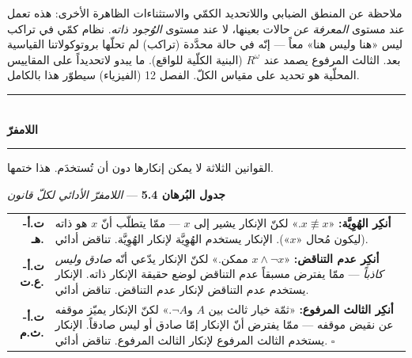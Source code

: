 \documentclass[10pt, openany, oneside]{book}
\renewcommand{\normalsize}{\fontsize{10}{13}\selectfont}
\renewcommand{\footnotesize}{\fontsize{8.5}{11}\selectfont}
\begin{document}
ملاحظة عن المنطق الضبابي واللاتحديد الكمّي والاستثناءات الظاهرة الأخرى: هذه تعمل عند مستوى \textit{المعرفة عن} حالات بعينها، لا عند مستوى \textit{الوُجود ذاته}. نظام كمّي في تراكب ليس «هنا وليس هنا» معاً --- إنّه في حالة محدَّدة (تراكب) لم تحلّها بروتوكولاتنا القياسية بعد. الثالث المرفوع يصمد عند $R^\omega$ (البنية الكلّية للواقع). ما يبدو لاتحديداً على المقاييس المحلّية هو تحديد على مقياس الكلّ. الفصل 12 (الفيزياء) سيطوّر هذا بالكامل.

\vspace{1.5em}


\begin{center}
    \rule{0.3\textwidth}{0.4pt}\\[0.5em]
    {\normalsize\bfseries اللامفرّ}\\[0.3em]
    \rule{0.3\textwidth}{0.4pt}
\end{center}

\vspace{1em}

\noindent القوانين الثلاثة لا يمكن إنكارها دون أن تُستخدَم. هذا ختمها.

\vspace{0.5em}

\textbf{جدول البُرهان 5.4} --- \textit{اللامفرّ الأدائي لكلّ قانون}

\vspace{0.5em}

{\footnotesize
\noindent\begin{tabular}{r p{}}
\textbf{ت.أ-هـ.} & \textbf{أنكِر الهُوِيَّة:} «$x \not\equiv x$.» لكنّ الإنكار يشير إلى $x$ --- ممّا يتطلّب أنّ $x$ هو ذاته (ليكون مُحال «$x$»). الإنكار يستخدم الهُوِيَّة لإنكار الهُوِيَّة. تناقض أدائي. \\[0.3em]
\textbf{ت.أ-ع.ت.} & \textbf{أنكِر عدم التناقض:} «$x \wedge \neg x$ ممكن.» لكنّ الإنكار يدّعي أنّه \textit{صادق وليس كاذباً} --- ممّا يفترض مسبقاً عدم التناقض لوضع حقيقة الإنكار ذاته. الإنكار يستخدم عدم التناقض لإنكار عدم التناقض. تناقض أدائي. \\[0.3em]
\textbf{ت.أ-ث.م.} & \textbf{أنكِر الثالث المرفوع:} «ثمّة خيار ثالث بين $A$ و$\neg A$.» لكنّ الإنكار يميّز موقفه عن نقيض موقفه --- ممّا يفترض أنّ الإنكار إمّا صادق أو ليس صادقاً. الإنكار يستخدم الثالث المرفوع لإنكار الثالث المرفوع. تناقض أدائي. $\square$ \\[0.3em]
\end{tabular}
}
\end{document}
